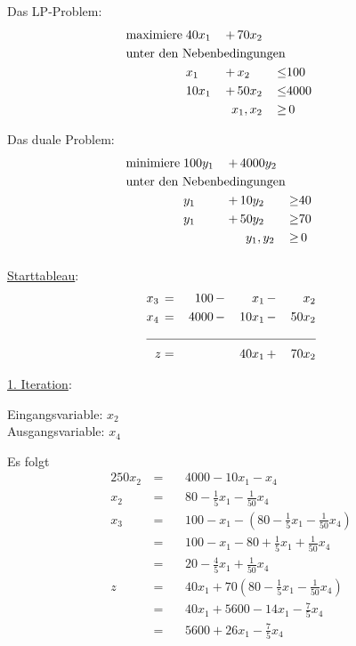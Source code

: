 \documentclass[10pt,a4paper,oneside,ngerman,numbers=noenddot]{scrartcl}
\begin{document}
	\subsection{} %
		Das LP-Problem:
		\begin{alignat*}{3}
			\text{maximiere}\; & 40x_{1} \,&+&\, 70x_{2} && \\
			\multicolumn{6}{l}{\text{unter den Nebenbedingungen}} && \\
			\;& x_{1} \,&+&\, x_{2} \,&\leq & 100 \\
			\;& 10x_{1} \,&+&\, 50x_{2} \,&\leq & 4000 \\
			\multicolumn{4}{r}{$x_{1}, x_{2}$} \,&\geq &\, 0
		\end{alignat*}
		
		Das duale Problem:
		\begin{alignat*}{3}
			\text{minimiere}\; & 100y_{1} \,&+&\, 4000y_{2} && \\
			\multicolumn{6}{l}{\text{unter den Nebenbedingungen}} && \\
			\;& y_{1} \,&+&\, 10y_{2} \,&\geq & 40 \\
			\;& y_{1} \,&+&\, 50y_{2} \,&\geq & 70 \\
			\multicolumn{4}{r}{$y_{1}, y_{2}$} \,&\geq &\, 0
		\end{alignat*}

		\subsubsection{} %
			\underline{Starttableau}:
			\begin{alignat*}{4}
				x_{3} \,&=&\, 100 \,&-&\, x_{1} \,&-&\, x_{2} \\
				x_{4} \,&=&\, 4000 \,&-&\, 10x_{1} \,&-&\, 50x_{2} \\ \cline{1 - 7}
				z &=& &&\, 40x_{1} \,&+&\, 70x_{2}
			\end{alignat*}
			
			\underline{1. Iteration}:
		
			Eingangsvariable: $x_{2}$\\
			Ausgangsvariable: $x_{4}$
		
			Es folgt
			\begin{alignat*}{2}
				50x_{2} \,&=&&\, 4000 - 10x_{1} - x_{4} \\
				x_{2} \,&=&&\, 80 - \frac{1}{5}x_{1} - \frac{1}{50}x_{4} \\
				x_{3} \,&=&&\, 100 - x_{1} - \left(80 - \frac{1}{5}x_{1} - \frac{1}{50}x_{4}\right) \\
				&=&&\, 100 - x_{1} - 80 + \frac{1}{5}x_{1} + \frac{1}{50}x_{4} \\
				&=&&\, 20 - \frac{4}{5}x_{1} + \frac{1}{50}x_{4} \\
				z \,&=&&\, 40x_{1} + 70\left(80 - \frac{1}{5}x_{1} - \frac{1}{50}x_{4}\right) \\
				&=&&\, 40x_{1} + 5600 - 14x_{1} - \frac{7}{5}x_{4} \\
				&=&&\, 5600 + 26x_{1} - \frac{7}{5}x_{4}
			\end{alignat*}
		
\end{document}
